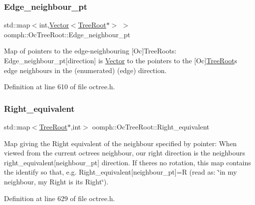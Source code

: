 \subsubsection{\texorpdfstring{Edge\+\_\+neighbour\+\_\+pt}{Edge\_neighbour\_pt}}
{\footnotesize\ttfamily std\+::map$<$int,\hyperlink{classoomph_1_1Vector}{Vector}$<$\hyperlink{classoomph_1_1TreeRoot}{Tree\+Root}$\ast$$>$ $>$ oomph\+::\+Oc\+Tree\+Root\+::\+Edge\+\_\+neighbour\+\_\+pt\hspace{0.3cm}{\ttfamily [private]}}



Map of pointers to the edge-\/neighbouring \mbox{[}Oc\mbox{]}Tree\+Roots\+: Edge\+\_\+neighbour\+\_\+pt\mbox{[}direction\mbox{]} is \hyperlink{classoomph_1_1Vector}{Vector} to the pointers to the \mbox{[}Oc\mbox{]}\hyperlink{classoomph_1_1TreeRoot}{Tree\+Root}\textquotesingle{}s edge neighbours in the (enumerated) (edge) direction. 



Definition at line 610 of file octree.\+h.

\mbox{\label{classoomph_1_1OcTreeRoot_a400dfaf6af4fe47b061faafddfb14680}} 
\subsubsection{\texorpdfstring{Right\+\_\+equivalent}{Right\_equivalent}}
{\footnotesize\ttfamily std\+::map$<$\hyperlink{classoomph_1_1TreeRoot}{Tree\+Root}$\ast$,int$>$ oomph\+::\+Oc\+Tree\+Root\+::\+Right\+\_\+equivalent\hspace{0.3cm}{\ttfamily [private]}}



Map giving the Right equivalent of the neighbour specified by pointer\+: When viewed from the current octree\textquotesingle{}s neighbour, our right direction is the neighbour\textquotesingle{}s right\+\_\+equivalent\mbox{[}neighbour\+\_\+pt\mbox{]} direction. If there\textquotesingle{}s no rotation, this map contains the identify so that, e.\+g. {\ttfamily Right\+\_\+equivalent}\mbox{[}neighbour\+\_\+pt\mbox{]}=R (read as\+: \char`\"{}in my
neighbour, my Right is its Right\char`\"{}). 



Definition at line 629 of file octree.\+h.

